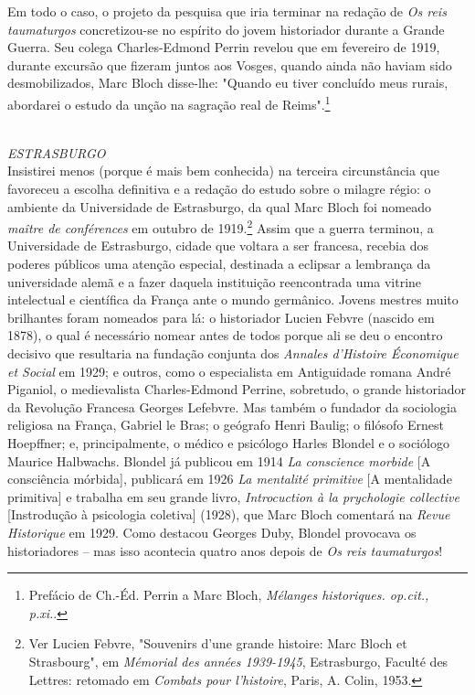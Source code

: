 \documentclass[a5paper]{book}
\begin{document}
Em todo o caso, o projeto da pesquisa que iria terminar na redação de \textit{Os reis taumaturgos} concretizou-se no espírito do jovem historiador durante a Grande Guerra. Seu colega Charles-Edmond Perrin revelou que em fevereiro de 1919, durante excursão que f{\kern0pt}izeram juntos aos Vosges, quando ainda não haviam sido desmobilizados, Marc Bloch disse-lhe: "Quando eu tiver concluído meus rurais, abordarei o estudo da unção na sagração real de Reims".\footnote{Prefácio de Ch.-Éd. Perrin a Marc Bloch, \textit{Mélanges historiques. op.cit., p.xi.}.}

~\\ \large \textit{ESTRASBURGO} ~\\

Insistirei menos (porque é mais bem conhecida) na terceira circunstância que favoreceu a escolha def{\kern0pt}initiva e a redação do estudo sobre o milagre régio: o ambiente da Universidade de Estrasburgo, da qual Marc Bloch foi nomeado \textit{maître de conférences} em outubro de 1919.\footnote{Ver Lucien Febvre, "Souvenirs d'une grande histoire: Marc Bloch et Strasbourg", em \textit{Mémorial des années 1939-1945}, Estrasburgo, Faculté des Lettres: retomado em \textit{Combats pour l'histoire}, Paris, A. Colin, 1953.} Assim que a guerra terminou, a Universidade de Estrasburgo, cidade que voltara a ser francesa, recebia dos poderes públicos uma atenção especial, destinada a eclipsar a lembrança da universidade alemã e a fazer daquela instituição reencontrada uma vitrine intelectual e científ{\kern0pt}ica da França ante o mundo germânico. Jovens mestres muito brilhantes foram nomeados para lá: o historiador Lucien Febvre (nascido em 1878), o qual é necessário nomear antes de todos porque ali se deu o encontro decisivo que resultaria na fundação conjunta dos \textit{Annales d'Histoire Économique et Social} em 1929; e outros, como o especialista em Antiguidade romana André Piganiol, o medievalista Charles-Edmond Perrine, sobretudo, o grande historiador da Revolução Francesa Georges Lefebvre. Mas também o fundador da sociologia religiosa na França, Gabriel le Bras; o geógrafo Henri Baulig; o f{\kern0pt}ilósofo Ernest Hoepf{\kern0pt}fner; e, principalmente, o médico e psicólogo Harles Blondel e o sociólogo Maurice Halbwachs. Blondel já publicou em 1914 \textit{La conscience morbide} [A consciência mórbida], publicará em 1926 \textit{La mentalité primitive} [A mentalidade primitiva] e trabalha em seu grande livro, \textit{Introcuction à la prychologie collective} [Instrodução à psicologia coletiva] (1928), que Marc Bloch comentará na \textit{Revue Historique} em 1929. Como destacou Georges Duby, Blondel provocava os historiadores -- mas isso acontecia quatro anos depois de \textit{Os reis taumaturgos}!
\end{document}
